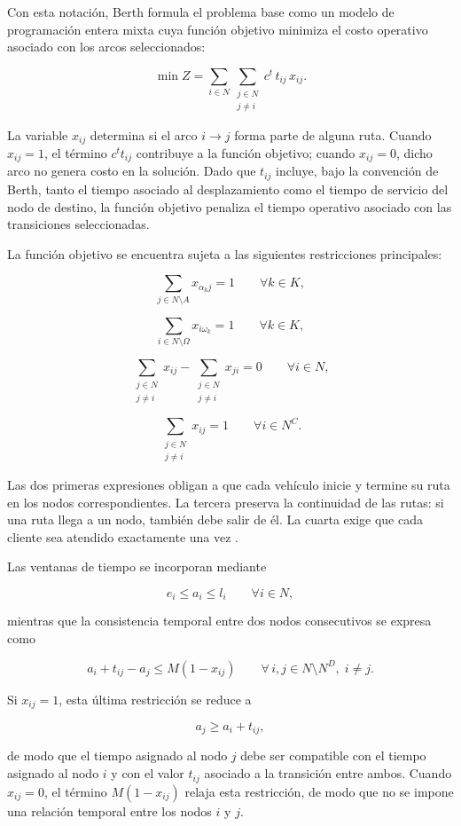 \documentclass[11pt]{article}
\begin{document}
Con esta notación, Berth formula el problema base como un modelo de programación
entera mixta cuya función objetivo minimiza el costo operativo asociado con los
arcos seleccionados:

\[
\min Z =
\sum_{i\in N}
\sum_{\substack{j\in N\\j\neq i}}
c^t\,t_{ij}\,x_{ij}.
\]

La variable \(x_{ij}\) determina si el arco \(i\rightarrow j\) forma parte de alguna
ruta. Cuando \(x_{ij}=1\), el término \(c^t t_{ij}\) contribuye a la función objetivo;
cuando \(x_{ij}=0\), dicho arco no genera costo en la solución. Dado que \(t_{ij}\)
incluye, bajo la convención de Berth, tanto el tiempo asociado al desplazamiento como
el tiempo de servicio del nodo de destino, la función objetivo penaliza el tiempo
operativo asociado con las transiciones seleccionadas.

La función objetivo se encuentra sujeta a las siguientes restricciones principales:

\[
\sum_{j\in N\setminus A}x_{\alpha_kj}=1
\qquad \forall k\in K,
\]

\[
\sum_{i\in N\setminus\Omega}x_{i\omega_k}=1
\qquad \forall k\in K,
\]

\[
\sum_{\substack{j\in N\\j\neq i}}x_{ij}
-
\sum_{\substack{j\in N\\j\neq i}}x_{ji}
=0
\qquad \forall i\in N,
\]

\[
\sum_{\substack{j\in N\\j\neq i}}x_{ij}=1
\qquad \forall i\in N^C.
\]

Las dos primeras expresiones obligan a que cada vehículo inicie y termine su ruta
en los nodos correspondientes. La tercera preserva la continuidad de las rutas:
si una ruta llega a un nodo, también debe salir de él. La cuarta exige que cada
cliente sea atendido exactamente una vez
\parencite{berth_thesis_2025}.

Las ventanas de tiempo se incorporan mediante

\[
e_i\leq a_i\leq l_i
\qquad \forall i\in N,
\]

mientras que la consistencia temporal entre dos nodos consecutivos se expresa como

\[
a_i+t_{ij}-a_j
\leq
M(1-x_{ij})
\qquad
\forall\, i,j\in N\setminus N^D,\; i\neq j.
\]

Si \(x_{ij}=1\), esta última restricción se reduce a

\[
a_j\geq a_i+t_{ij},
\]

de modo que el tiempo asignado al nodo \(j\) debe ser compatible con el tiempo
asignado al nodo \(i\) y con el valor \(t_{ij}\) asociado a la transición entre ambos.
Cuando \(x_{ij}=0\), el término \(M(1-x_{ij})\) relaja esta restricción, de modo
que no se impone una relación temporal entre los nodos \(i\) y \(j\).
\end{document}
